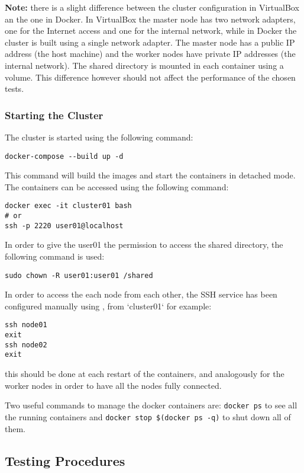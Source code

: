 \textbf{Note:} there is a slight difference between the cluster configuration in VirtualBox an the one in Docker. In VirtualBox the master node has two network adapters, one for the Internet access and one for the internal network, while in Docker the cluster is built using a single network adapter. The master node has a public IP address (the host machine) and the worker nodes have private IP addresses (the internal network). The shared directory is mounted in each container using a volume. This difference however should not affect the performance of the chosen tests.

\subsubsection{Starting the Cluster}
The cluster is started using the following command:

\begin{verbatim}
docker-compose --build up -d
\end{verbatim}
This command will build the images and start the containers in detached mode. The containers can be accessed using the following command:
\begin{verbatim}
docker exec -it cluster01 bash
# or
ssh -p 2220 user01@localhost
\end{verbatim}
In order to give the user01 the permission to access the shared directory, the following command is used:

\begin{verbatim}
sudo chown -R user01:user01 /shared
\end{verbatim}

In order to access the each node from each other, the SSH service has been configured manually using , from `cluster01` for example:

\begin{verbatim}
ssh node01
exit
ssh node02
exit
\end{verbatim}

this should be done at each restart of the containers, and analogously for the worker nodes in order to have all the nodes fully connected.

Two useful commands to manage the docker containers are: \texttt{docker ps} to see all the running containers and \texttt{docker stop \$(docker ps -q)} to shut down all of them.




\subsection{Testing Procedures}

